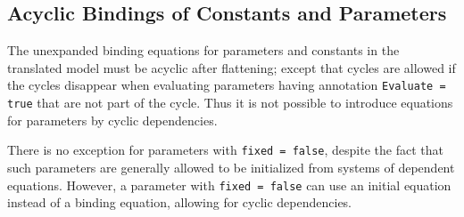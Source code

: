 \subsection{Acyclic Bindings of Constants and Parameters}\label{acyclic-bindings-of-constants-and-parameters}

The unexpanded binding equations for parameters and constants in the translated model must be acyclic after flattening; except that cycles are allowed if the cycles disappear when evaluating parameters having annotation \lstinline!Evaluate = true! that are not part of the cycle.
Thus it is not possible to introduce equations for parameters by cyclic dependencies.

\begin{nonnormative}
There is no exception for parameters with \lstinline!fixed = false!, despite the fact that such parameters are generally allowed to be initialized from systems of dependent equations.
However, a parameter with \lstinline!fixed = false! can use an initial equation instead of a binding equation, allowing for cyclic dependencies.
\end{nonnormative}

